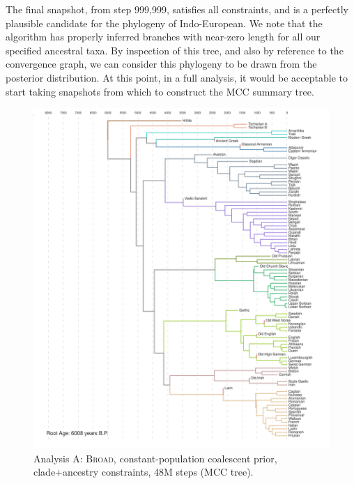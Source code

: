 \documentclass[10pt,journal,compsoc]{IEEEtran}
\begin{document}
The final snapshot, from step 999,999, satisfies all constraints, and is a perfectly plausible candidate for the phylogeny of Indo-European. We note that the algorithm has properly inferred branches with near-zero length for all our specified ancestral taxa. By inspection of this tree, and also by reference to the convergence graph, we can consider this phylogeny to be drawn from the posterior distribution. At this point, in a full analysis, it would be acceptable to start taking snapshots from which to construct the MCC summary tree.

\begin{figure}
    \caption{Analysis A: \textsc{Broad}, constant-population coalescent prior, clade+ancestry constraints, 48M steps (MCC tree).}\label{fig:analysisA}
    \includegraphics[width=\textwidth, center]{runs24-broad-constant}
\end{figure}
\end{document}
